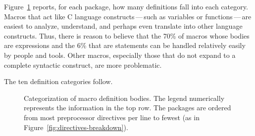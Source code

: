 \documentclass[10pt]{article}
\newcommand{\captionsmall}[1]{\caption[]{\small #1}}
\begin{document}
Figure~\ref{fig:categorization} reports, for each package, how many
definitions fall into each category.  Macros that
act like C language constructs\,---\,such as variables or
functions\,---\,are easiest to analyze, understand, and perhaps even
translate into other language constructs.  Thus, there is reason to believe
that the 70\% of macros whose bodies are expressions and the 6\% that are
statements can be handled relatively easily by people and tools.  Other
macros, especially those that do not expand to a complete syntactic
construct, are more problematic.


The ten definition categories follow.  



\begin{figure}
\centerline{}
\captionsmall{Categorization of macro definition bodies.  The legend numerically
  represents the information in the top row.  The packages are ordered from
  most preprocessor directives per line to fewest (as in
  Figure~\ref{fig:directives-breakdown}).}
\label{fig:categorization}
\end{figure}



\label{sec:categorization-details}
\end{document}
